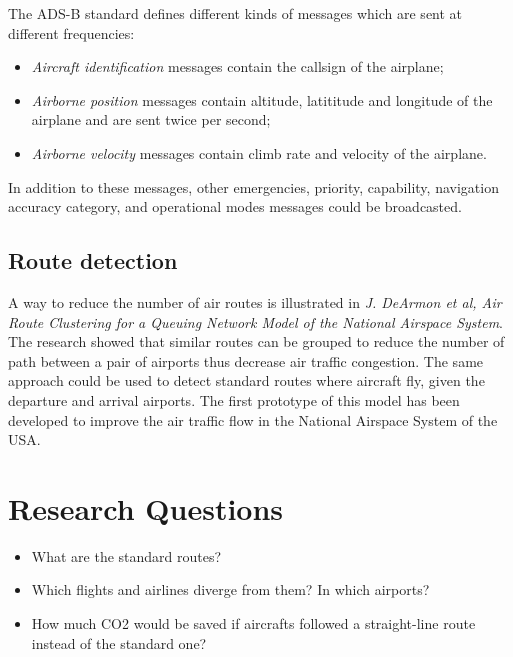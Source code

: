 \documentclass{vldb}
\begin{document}
    The ADS-B standard defines different kinds of messages which are sent at different frequencies:
    \begin{itemize}
        \item \textit{Aircraft identification} messages contain the callsign of the airplane;
        \item \textit{Airborne position} messages contain altitude, latititude and longitude of the airplane and are sent twice per second;
        \item \textit{Airborne velocity} messages contain climb rate and velocity of the airplane.
    \end{itemize}
    In addition to these messages, other emergencies, priority, capability, navigation accuracy category, and operational modes messages could be broadcasted.

\subsection{Route detection}
A way to reduce the number of air routes is illustrated in \textit{J. DeArmon et al, Air Route Clustering for a Queuing Network Model of the National Airspace System}. The research showed that similar routes can be grouped to reduce the number of path between a pair of airports thus decrease air traffic congestion. The same approach could be used to detect standard routes where aircraft fly, given the departure and arrival airports. The first prototype of this model has been developed to improve the air traffic flow in the National Airspace System of the USA.

    

\section{Research Questions}

\begin{itemize}
  \item What are the standard routes?
  \item Which flights and airlines diverge from them? In which airports?
  \item How much CO2 would be saved if aircrafts followed a straight-line route
  instead of the standard one?
\end{itemize}
\end{document}
